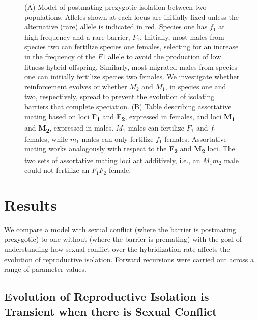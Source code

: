 \documentclass[11pt]{article}
\begin{document}
\begin{figure}[!htb]
\centering
{}
\caption{(A) Model of postmating prezygotic isolation between two populations. Alleles shown at each locus are initially fixed unless the alternative (rare) allele is indicated in red. Species one has $f_1$ at high frequency and a rare barrier, $F_1$.  Initially, most males from species two can fertilize species one females, selecting for an increase in the frequency of the $F1$ allele to avoid the production of low fitness hybrid offspring.  Similarly, most migrated males from species one can initially fertilize species two females. We investigate whether reinforcement evolves or whether $M_2$ and $M_1$, in species one and two, respectively, spread to prevent the evolution of isolating barriers that complete speciation. (B) Table describing assortative mating based on loci \textbf{\texorpdfstring{F\textsubscript{1}}{F 1}} and \textbf{\texorpdfstring{F\textsubscript{2}}{F 2}}, expressed in females, and loci \textbf{\texorpdfstring{M\textsubscript{1}}{M 1}} and \textbf{\texorpdfstring{M\textsubscript{2}}{M 2}}, expressed in males.  $M_1$ males can fertilize $F_1$ and $f_1$ females, while $m_1$ males can only fertilize $f_1$ females. Assortative mating works analogously with respect to the \textbf{\texorpdfstring{F\textsubscript{2}}{F 2}} and \textbf{\texorpdfstring{M\textsubscript{2}}{M 2}} loci. The two sets of assortative mating loci act additively, i.e., an $M_1 m_2$ male could not fertilize an $F_1 F_2$ female. }
\label{fig:model}
\end{figure}



\section*{Results}

We compare a model with sexual conflict (where the barrier is postmating prezygotic) to one without (where the barrier is premating) with the goal of understanding how sexual conflict over the hybridization rate affects the evolution of reproductive isolation. Forward recursions were carried out across a range of parameter values. 

\subsection*{Evolution of Reproductive Isolation is Transient when there is Sexual Conflict}
\end{document}
